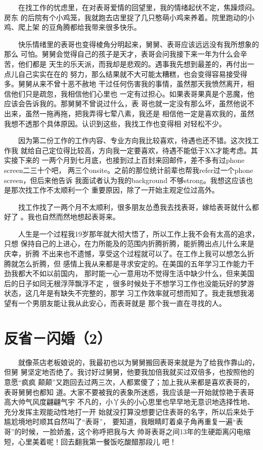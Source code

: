 \documentclass[12pt]{book}
\begin{document}
　　在找工作的忧虑里，在对表哥爱情的回望里，我的情绪起伏不定，焦躁烦闷。房东
的后院有个小鸡笼，我就跑去店里捉了几只憨萌小鸡来养着。院里跑动的小鸡、爬上架
的豆角腾都给我带来很多快乐。

　　快乐情绪里的表哥也变得棱角分明起来，舅舅、表哥应该远远没有我所想象的那么
可怕。舅舅会觉得自己的孩子是天才，表哥会问我接下来一年为什么会辛苦，他们都是
天生的乐天派，而我却是悲观的。遇事我先想到最差的，再付出一点儿自己实实在在的
努力，那么结果就不大可能太糟糕，也会变得容易接受得多。舅舅从来不曾十恶不赦地
干过任何伤害我的事情，虽然那天我愤然离开，相信他们只是疏忽，我相信他们心里也
一定有过担心。如果表哥果真是个恶魔，他应该会告诉我的。那舅舅不曾说过什么，表
哥也就一定没有那么坏，虽然他说不出来，虽然一拖再拖，把我弄得七荤八素，我还是
相信他一定是喜欢我的，虽然我想不透那个具体原因。认识到这些，我找工作也变得相
对轻松不少。

　　因为第二份工作的工作内容、专业方向我比较喜欢，待遇也还不错。这次找工作我
就给自己定位得比较高，方向我一定要喜欢，待遇不能低于XX才能考虑。其实接下来的
一两个月到七月底，也接到过上百封来回邮件，差不多有过phone screen二三十个吧，
两三个onsite。之前的那位统计前辈也帮我refer过一个phone screen，但后来他告诉
我面试者认为我的background 不够strong。我想这应该也是那次找工作不太顺利一个
重要原因，除了一开始主观定位过高外。

　　找工作找了一两个月不太顺利，很多朋友怂恿我去找表哥，嫁给表哥就什么都好了
。我也自然而然地想起表哥来。

　　人生是一个过程我19岁那年就大彻大悟了，所以工作上我不会有太高的追求，只想
保持自己的上进心，在力所能及的范围内折腾折腾，能折腾出点儿什么来是庆幸，折腾
不出来也不遗憾，享受这个过程就可以了。在工作上我可以想怎么折腾就怎么折腾，但
感情上我从来都是寻求安定的。在美国的五年学习工作能力干劲我都大不如以前国内，
那时能一心一意用功不觉得生活中缺少什么，但来美国后的日子如同无根浮萍飘浮不定
，很多时候处于不想学习工作也没能玩好的梦游状态，这几年是有缺失不完整的，那学
习工作效率就可想而知了。我走我想我渴望有一个男朋友能让我从此安心，而表哥就是
那个我一直在寻找的人。
\section{反省－闪婚（2）}
\label{sec-8-24}

　　就像茶店老板娘说的，我最初也以为舅舅搬回表哥来就是为了给我作靠山的，但舅
舅坚定地否绝了。我讨好过舅舅，他要我加倍我就买过双倍多，也按照他的意愿“疯疯
颠颠”又跑回去过两三次，人都累傻了；加上我从来都是喜欢表哥的，表哥舅舅也都知
道。大家不要被我的表象所迷惑，我应该是一开始就惊艳于表哥高大帅气风度翩翩气宇
不凡的，小丫头的小心思里也早早地无意识地选择性地、充分发挥主观能动性地打一开
始就没打算没想要记住表哥的名字，所以后来处于尴尬境地时顺其自然叫了“表哥”，
要知道，我眼睛盯着桌子角再重复一遍“表哥”的时候，一脸娇羞，这个称呼把我与大
帅哥表哥之间13年的生硬距离闪电缩短，心里美着呢！回去翻我第一餐饭吃酸醋那段儿
吧！
\end{document}
